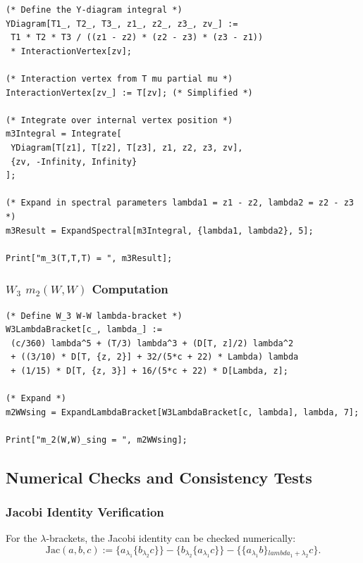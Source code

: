 \begin{verbatim}
(* Define the Y-diagram integral *)
YDiagram[T1_, T2_, T3_, z1_, z2_, z3_, zv_] :=
 T1 * T2 * T3 / ((z1 - z2) * (z2 - z3) * (z3 - z1))
 * InteractionVertex[zv];

(* Interaction vertex from T mu partial mu *)
InteractionVertex[zv_] := T[zv]; (* Simplified *)

(* Integrate over internal vertex position *)
m3Integral = Integrate[
 YDiagram[T[z1], T[z2], T[z3], z1, z2, z3, zv],
 {zv, -Infinity, Infinity}
];

(* Expand in spectral parameters lambda1 = z1 - z2, lambda2 = z2 - z3 *)
m3Result = ExpandSpectral[m3Integral, {lambda1, lambda2}, 5];

Print["m_3(T,T,T) = ", m3Result];
\end{verbatim}

\subsubsection{$W_3$ $m_2(W,W)$ Computation}

\begin{verbatim}
(* Define W_3 W-W lambda-bracket *)
W3LambdaBracket[c_, lambda_] :=
 (c/360) lambda^5 + (T/3) lambda^3 + (D[T, z]/2) lambda^2
 + ((3/10) * D[T, {z, 2}] + 32/(5*c + 22) * Lambda) lambda
 + (1/15) * D[T, {z, 3}] + 16/(5*c + 22) * D[Lambda, z];

(* Expand *)
m2WWsing = ExpandLambdaBracket[W3LambdaBracket[c, lambda], lambda, 7];

Print["m_2(W,W)_sing = ", m2WWsing];
\end{verbatim}

\subsection{Numerical Checks and Consistency Tests}

\subsubsection{Jacobi Identity Verification}

For the $\lambda$-brackets, the Jacobi identity can be checked numerically:
\begin{equation}
\text{Jac}(a,b,c) := \{a {}_{\lambda_1} \{b {}_{\lambda_2} c\}\} - \{b {}_{\lambda_2} \{a {}_{\lambda_1} c\}\} - \{\{a {}_{\lambda_1} b\} {}_{lambda_1 + \lambda_2} c\}.
\end{equation}

